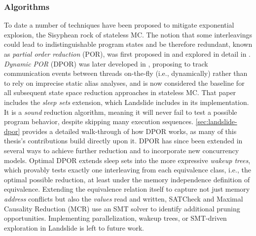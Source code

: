 \subsubsection{Algorithms}
\label{sec:related-algs}

To date a number of techniques have been proposed to mitigate exponential explosion,
the Sisyphean rock of stateless MC.
The notion that some interleavings
could lead to indistinguishable program states and be therefore redundant,
known as {\em partial order reduction} (POR),
was first proposed in \cite{partial-model-checking}
and explored in detail in \cite{partial-order-methods}.
{\em Dynamic POR} (DPOR) was later developed in \cite{dpor},
proposing to track communication events between threads on-the-fly (i.e., dynamically)
rather than to rely on imprecise static alias analyses,
and is now considered the baseline for all subsequent state space reduction approaches in stateless MC.
That paper includes the {\em sleep sets} extension,
which Landslide includes in its implementation.
It is a {\em sound} reduction algorithm, meaning it will never fail to test a possible program behavior, despite skipping many execution sequences.
\cref{sec:landslide-dpor} provides a detailed walk-through of how DPOR works,
as many of this thesis's contributions build directly upon it.
%
DPOR has since been extended in several ways to achieve further reduction
and to incorporate new concurrency models.
Optimal DPOR \cite{optimal-dpor} extends sleep sets into the more expressive {\em wakeup trees},
which provably tests exactly one interleaving from each equivalence class,
i.e., the optimal possible reduction,
at least under the memory independence definition of equivalence.
Extending the equivalence relation itself to capture not just memory {\em address} conflicts
but also the {\em values} read and written,
SATCheck \cite{satcheck} and Maximal Causality Reduction (MCR) \cite{mcr}
use an SMT solver \cite{z3} to identify additional pruning opportunities.
Implementing parallelization, wakeup trees, or SMT-driven exploration in Landslide is left to future work.

